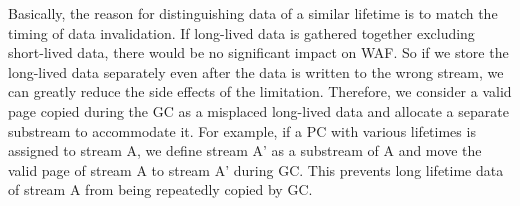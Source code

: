 Basically, the reason for distinguishing data of a similar lifetime is 
to match the timing of data invalidation. 
If long-lived data is gathered together excluding short-lived data, 
there would be no significant impact on WAF. 
So if we store the long-lived data separately even after 
the data is written to the wrong stream, 
we can greatly reduce the side effects of the limitation. 
Therefore, we consider a valid page copied during the GC 
as a misplaced long-lived data 
and allocate a separate substream to accommodate it. 
For example, if a PC with various lifetimes is assigned to stream A, 
we define stream A' as a substream of A and 
move the valid page of stream A to stream A' during GC. 
This prevents long lifetime data of stream A from being repeatedly copied 
by GC.



